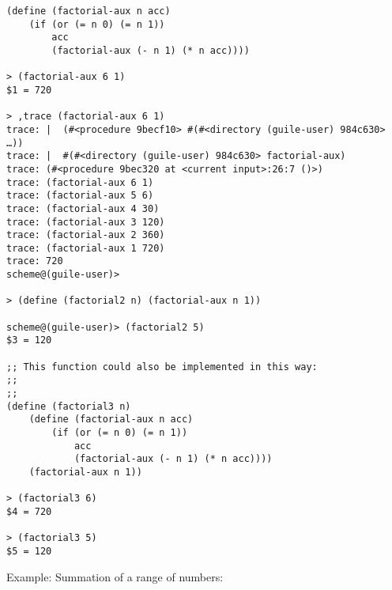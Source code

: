 \documentclass[11pt]{article}
\begin{document}
\begin{verbatim}
(define (factorial-aux n acc)
    (if (or (= n 0) (= n 1))
        acc
        (factorial-aux (- n 1) (* n acc))))

> (factorial-aux 6 1)
$1 = 720

> ,trace (factorial-aux 6 1)
trace: |  (#<procedure 9becf10> #(#<directory (guile-user) 984c630> …))
trace: |  #(#<directory (guile-user) 984c630> factorial-aux)
trace: (#<procedure 9bec320 at <current input>:26:7 ()>)
trace: (factorial-aux 6 1)
trace: (factorial-aux 5 6)
trace: (factorial-aux 4 30)
trace: (factorial-aux 3 120)
trace: (factorial-aux 2 360)
trace: (factorial-aux 1 720)
trace: 720
scheme@(guile-user)> 

> (define (factorial2 n) (factorial-aux n 1))

scheme@(guile-user)> (factorial2 5)
$3 = 120

;; This function could also be implemented in this way:
;;
;;
(define (factorial3 n) 
    (define (factorial-aux n acc)
        (if (or (= n 0) (= n 1))
            acc
            (factorial-aux (- n 1) (* n acc))))        
    (factorial-aux n 1))

> (factorial3 6)
$4 = 720

> (factorial3 5)
$5 = 120
\end{verbatim}

Example: Summation of a range of numbers:
\end{document}
